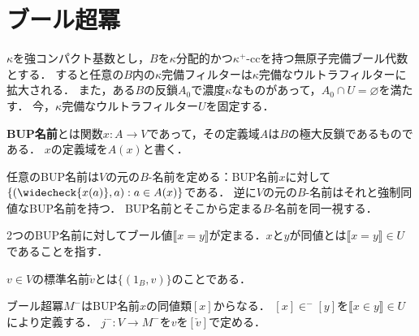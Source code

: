 \documentclass[uplatex,dvipdfmx]{jsarticle}
\newcommand{\truth}[1]{\llbracket #1 \rrbracket}
\renewcommand\emptyset{\varnothing}
\theoremstyle{definition}
\begin{document}
	\section{ブール超冪}
	
	$\kappa$を強コンパクト基数とし，$B$を$\kappa$分配的かつ$\kappa^+$-ccを持つ無原子完備ブール代数とする．
	すると任意の$B$内の$\kappa$完備フィルターは$\kappa$完備なウルトラフィルターに拡大される．
	また，ある$B$の反鎖$A_0$で濃度$\kappa$なものがあって，$A_0 \cap U = \emptyset$を満たす．
	今，$\kappa$完備なウルトラフィルター$U$を固定する．
	
	\textbf{BUP名前}とは関数$x \colon A \to V$であって，その定義域$A$は$B$の極大反鎖であるものである．
	$x$の定義域を$A(x)$と書く．
	
	任意のBUP名前は$V$の元の$B$-名前を定める：BUP名前$x$に対して$\{ (\widecheck{x(a)}, a) : a \in A(x) \}$である．
	逆に$V$の元の$B$-名前はそれと強制同値なBUP名前を持つ．
	BUP名前とそこから定まる$B$-名前を同一視する．
	
	2つのBUP名前に対してブール値$\truth{x=y}$が定まる．$x$と$y$が同値とは$\truth{x=y} \in U$であることを指す．
	
	$v \in V$の標準名前$\check{v}$とは$\{ (1_B, v) \}$のことである．
	
	ブール超冪$M^-$はBUP名前$x$の同値類$[x]$からなる．
	$[x] \in^- [y]$を$\truth{x \in y} \in U$により定義する．
	$j^- \colon V \to M^-$を$v$を$[\check{v}]$で定める．
	
	
	
	
	\nocite{*}
	\printbibliography[title={参考文献}]
\end{document}

